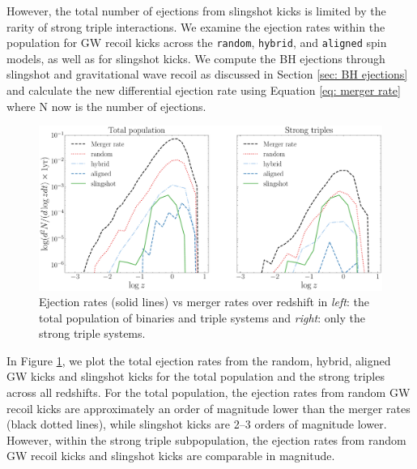 \documentclass[11pt, letterpaper]{article}
\begin{document}
However, the total number of ejections from slingshot kicks is limited by the rarity of strong triple interactions. We examine the ejection rates within the population for GW recoil kicks across the \texttt{random}, \texttt{hybrid}, and \texttt{aligned} spin models, as well as for slingshot kicks. We compute the BH ejections through slingshot and gravitational wave recoil as discussed in Section \ref{sec: BH ejections} and calculate the new differential ejection rate using Equation \ref{eq: merger rate} where N now is the number of ejections. 

\begin{figure}[!htb]
    \centering
    \includegraphics[scale=0.5]{fig/ejection_rates_all_and_triples_100.pdf}
    \caption{ Ejection rates (solid lines) vs merger rates over redshift in \textit{left}: the total population of binaries and triple systems and \textit{right}: only the strong triple systems.}
    \label{fig:escape-and-merger-rates-across-z}
\end{figure}


In Figure \ref{fig:escape-and-merger-rates-across-z}, we plot the total ejection rates  from the random, hybrid, aligned GW kicks and slingshot kicks for the total population and the strong triples across all redshifts. For the total population, the ejection rates from random GW recoil kicks are approximately an order of magnitude lower than the merger rates (black dotted lines), while slingshot kicks are 2–3 orders of magnitude lower. However, within the strong triple subpopulation, the ejection rates from random GW recoil kicks and slingshot kicks are comparable in magnitude.
\end{document}
